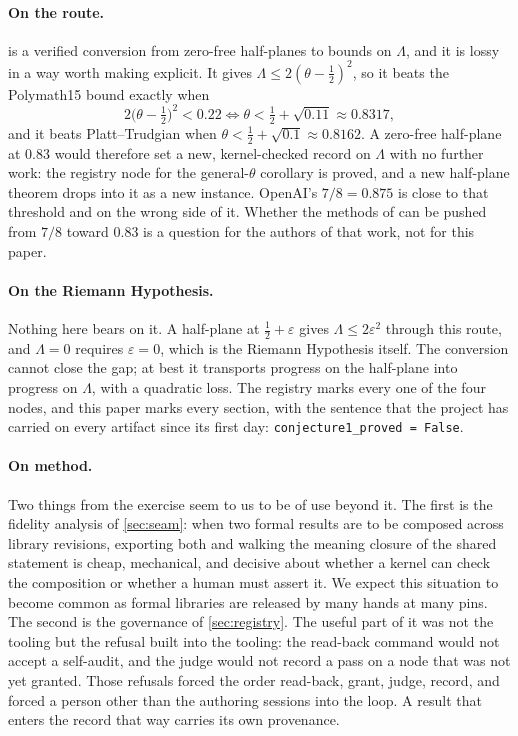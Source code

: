 \documentclass[11pt]{article}
\theoremstyle{definition}
\newcommand{\lean}[1]{\texttt{#1}}
\newcommand{\Lam}{\Lambda}
\begin{document}
\paragraph{On the route.}  is a verified conversion from zero-free half-planes to bounds on $\Lam$, and it is lossy in a way worth making explicit. It gives $\Lam \le 2(\theta - \tfrac12)^2$, so it beats the Polymath15 bound exactly when
\[
2\bigl(\theta - \tfrac12\bigr)^2 < 0.22 \iff \theta < \tfrac12 + \sqrt{0.11} \approx 0.8317,
\]
and it beats Platt--Trudgian when $\theta < \tfrac12 + \sqrt{0.1} \approx 0.8162$. A zero-free half-plane at $0.83$ would therefore set a new, kernel-checked record on $\Lam$ with no further work: the registry node for the general-$\theta$ corollary is proved, and a new half-plane theorem drops into it as a new instance. OpenAI's $7/8 = 0.875$ is close to that threshold and on the wrong side of it. Whether the methods of \cite{OAIqrh} can be pushed from $7/8$ toward $0.83$ is a question for the authors of that work, not for this paper.

\paragraph{On the Riemann Hypothesis.} Nothing here bears on it. A half-plane at $\tfrac12 + \varepsilon$ gives $\Lam \le 2\varepsilon^2$ through this route, and $\Lam = 0$ requires $\varepsilon = 0$, which is the Riemann Hypothesis itself. The conversion cannot close the gap; at best it transports progress on the half-plane into progress on $\Lam$, with a quadratic loss. The registry marks every one of the four nodes, and this paper marks every section, with the sentence that the project has carried on every artifact since its first day: \lean{conjecture1\_proved = False}.

\paragraph{On method.} Two things from the exercise seem to us to be of use beyond it. The first is the fidelity analysis of \cref{sec:seam}: when two formal results are to be composed across library revisions, exporting both and walking the meaning closure of the shared statement is cheap, mechanical, and decisive about whether a kernel can check the composition or whether a human must assert it. We expect this situation to become common as formal libraries are released by many hands at many pins. The second is the governance of \cref{sec:registry}. The useful part of it was not the tooling but the refusal built into the tooling: the read-back command would not accept a self-audit, and the judge would not record a pass on a node that was not yet granted. Those refusals forced the order read-back, grant, judge, record, and forced a person other than the authoring sessions into the loop. A result that enters the record that way carries its own provenance.
\end{document}
